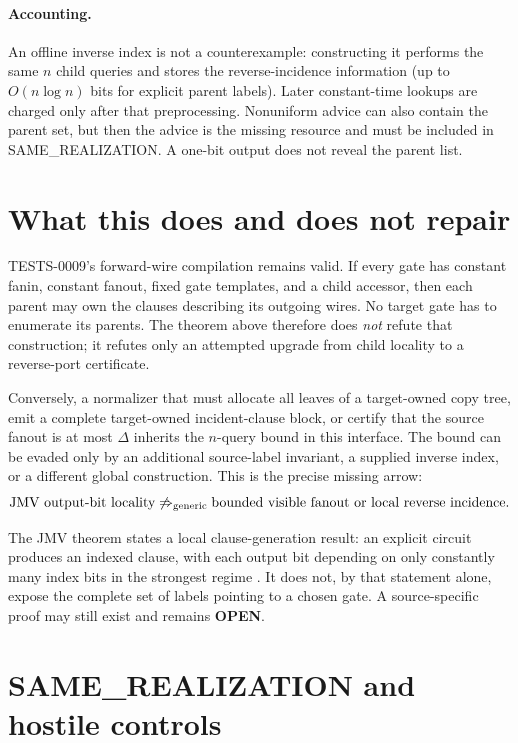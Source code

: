 \documentclass[11pt]{article}
\newcommand{\OPEN}{\textbf{OPEN}}
\begin{document}
\paragraph{Accounting.}
An offline inverse index is not a counterexample: constructing it performs
the same $n$ child queries and stores the reverse-incidence information
(up to $O(n\log n)$ bits for explicit parent labels).  Later constant-time
lookups are charged only after that preprocessing.  Nonuniform advice can
also contain the parent set, but then the advice is the missing resource and
must be included in SAME\_REALIZATION.  A one-bit output does not reveal the
parent list.

\section{What this does and does not repair}

TESTS-0009's forward-wire compilation remains valid.  If every gate has
constant fanin, constant fanout, fixed gate templates, and a child accessor,
then each parent may own the clauses describing its outgoing wires.  No
target gate has to enumerate its parents.  The theorem above therefore does
\emph{not} refute that construction; it refutes only an attempted upgrade
from child locality to a reverse-port certificate.

Conversely, a normalizer that must allocate all leaves of a target-owned
copy tree, emit a complete target-owned incident-clause block, or certify
that the source fanout is at most $\Delta$ inherits the $n$-query bound in
this interface.  The bound can be evaded only by an additional source-label
invariant, a supplied inverse index, or a different global construction.
This is the precise missing arrow:
\[
 \text{JMV output-bit locality}
 \not\Rightarrow_{\rm generic}
 \text{bounded visible fanout or local reverse incidence}.
\]

The JMV theorem states a local clause-generation result: an explicit circuit
produces an indexed clause, with each output bit depending on only constantly
many index bits in the strongest regime \cite{jmv}.  It does not, by that
statement alone, expose the complete set of labels pointing to a chosen
gate.  A source-specific proof may still exist and remains \OPEN.

\section{SAME\_REALIZATION and hostile controls}
\end{document}
